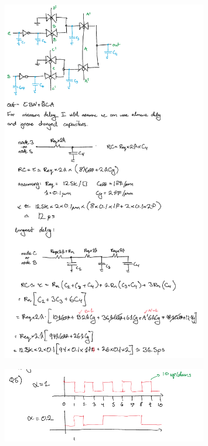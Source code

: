\documentclass[11pt]{article}
\begin{document}
\begin{figure}[H]
    \centering
\includegraphics[width=0.8\textwidth]{3b.png}
\end{figure}
\begin{figure}[H]
    \centering
\includegraphics[width=0.8\textwidth]{5.png}
\end{figure}
\end{document}
